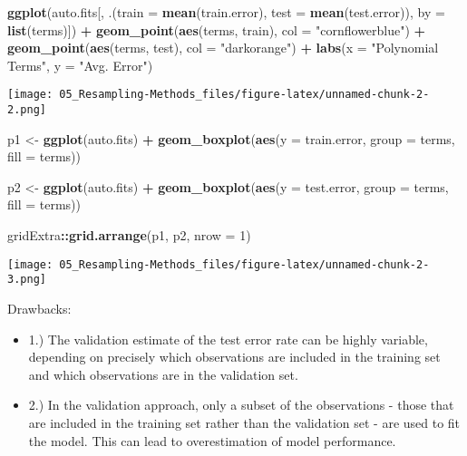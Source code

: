 \documentclass[12pt,]{report}
\newenvironment{Shaded}{\begin{snugshade}}{\end{snugshade}}
\newcommand{\DataTypeTok}[1]{\textcolor[rgb]{0.13,0.29,0.53}{#1}}
\newcommand{\DecValTok}[1]{\textcolor[rgb]{0.00,0.00,0.81}{#1}}
\newcommand{\KeywordTok}[1]{\textcolor[rgb]{0.13,0.29,0.53}{\textbf{#1}}}
\newcommand{\NormalTok}[1]{#1}
\newcommand{\OperatorTok}[1]{\textcolor[rgb]{0.81,0.36,0.00}{\textbf{#1}}}
\newcommand{\StringTok}[1]{\textcolor[rgb]{0.31,0.60,0.02}{#1}}
\begin{document}
\begin{Shaded}
\begin{Highlighting}[]
\KeywordTok{ggplot}\NormalTok{(auto.fits[, .(}\DataTypeTok{train =} \KeywordTok{mean}\NormalTok{(train.error), }\DataTypeTok{test =} \KeywordTok{mean}\NormalTok{(test.error)), }\DataTypeTok{by =} \KeywordTok{list}\NormalTok{(terms)]) }\OperatorTok{+}
\StringTok{   }\KeywordTok{geom_point}\NormalTok{(}\KeywordTok{aes}\NormalTok{(terms, train), }\DataTypeTok{col =} \StringTok{"cornflowerblue"}\NormalTok{) }\OperatorTok{+}
\StringTok{   }\KeywordTok{geom_point}\NormalTok{(}\KeywordTok{aes}\NormalTok{(terms, test), }\DataTypeTok{col =} \StringTok{"darkorange"}\NormalTok{) }\OperatorTok{+}
\StringTok{   }\KeywordTok{labs}\NormalTok{(}\DataTypeTok{x =} \StringTok{"Polynomial Terms"}\NormalTok{, }\DataTypeTok{y =} \StringTok{"Avg. Error"}\NormalTok{)}
\end{Highlighting}
\end{Shaded}

\texttt{[image: 05\_Resampling-Methods\_files/figure-latex/unnamed-chunk-2-2.png]}

\begin{Shaded}
\begin{Highlighting}[]
\NormalTok{p1 <-}\StringTok{ }\KeywordTok{ggplot}\NormalTok{(auto.fits) }\OperatorTok{+}
\StringTok{   }\KeywordTok{geom_boxplot}\NormalTok{(}\KeywordTok{aes}\NormalTok{(}\DataTypeTok{y =}\NormalTok{ train.error, }\DataTypeTok{group =}\NormalTok{ terms, }\DataTypeTok{fill =}\NormalTok{ terms))}

\NormalTok{p2 <-}\StringTok{ }\KeywordTok{ggplot}\NormalTok{(auto.fits) }\OperatorTok{+}
\StringTok{   }\KeywordTok{geom_boxplot}\NormalTok{(}\KeywordTok{aes}\NormalTok{(}\DataTypeTok{y =}\NormalTok{ test.error, }\DataTypeTok{group =}\NormalTok{ terms, }\DataTypeTok{fill =}\NormalTok{ terms))}

\NormalTok{gridExtra}\OperatorTok{::}\KeywordTok{grid.arrange}\NormalTok{(p1, p2, }\DataTypeTok{nrow =} \DecValTok{1}\NormalTok{)}
\end{Highlighting}
\end{Shaded}

\texttt{[image: 05\_Resampling-Methods\_files/figure-latex/unnamed-chunk-2-3.png]}

Drawbacks:

\begin{itemize}
\item
  1.) The validation estimate of the test error rate can be highly
  variable, depending on precisely which observations are included in
  the training set and which observations are in the validation set.
\item
  2.) In the validation approach, only a subset of the observations -
  those that are included in the training set rather than the validation
  set - are used to fit the model. This can lead to overestimation of
  model performance.
\end{itemize}
\end{document}
